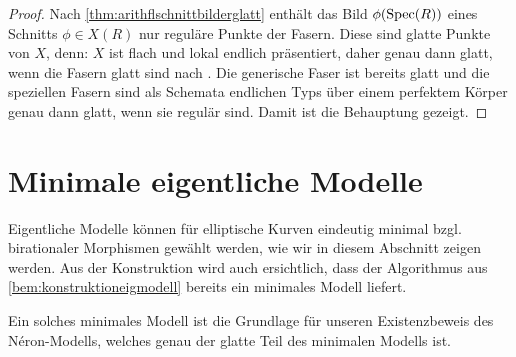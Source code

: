 \documentclass[german, bibliography=totoc]{scrreprt}
\begin{document}
\begin{Korollar}
\begin{proof}
    Nach \ref{thm:arithflschnittbilderglatt} enthält das Bild
    $\phi(\operatorname{Spec}(R))$ eines Schnitts $\phi\in X(R)$ nur reguläre
    Punkte der Fasern. Diese sind glatte Punkte von $X$, denn:
    $X$ ist flach und lokal endlich präsentiert, daher genau dann
    glatt, wenn die Fasern glatt sind nach
    \cite[8.5, Proposition 17]{bosch}.
    Die generische Faser ist bereits glatt und die speziellen Fasern
    sind als Schemata endlichen Typs über einem perfektem Körper
    genau dann glatt, wenn sie regulär sind.
    Damit ist die Behauptung gezeigt.
  \end{proof}
\end{Korollar}


\section{Minimale eigentliche Modelle}\label{chap:minmodelle}
Eigentliche Modelle können für elliptische Kurven eindeutig minimal
bzgl. birationaler Morphismen gewählt werden, wie wir in diesem
Abschnitt zeigen werden. Aus der Konstruktion wird auch ersichtlich,
dass der Algorithmus aus \ref{bem:konstruktioneigmodell} bereits ein
minimales Modell liefert.

Ein solches minimales Modell ist die Grundlage für unseren
Existenzbeweis des Néron-Modells, welches genau der glatte Teil des
minimalen Modells ist.
\end{document}
